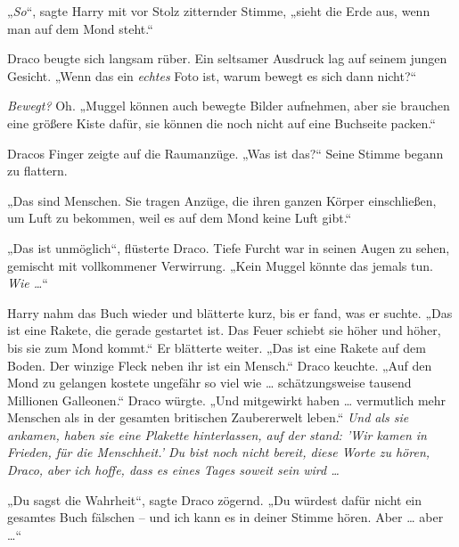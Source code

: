 {„\emph{So}“, sagte Harry mit vor Stolz zitternder Stimme, „sieht die Erde aus, wenn man auf dem Mond steht.“

Draco beugte sich langsam rüber. Ein seltsamer Ausdruck lag auf seinem jungen Gesicht. „Wenn das ein \emph{echtes} Foto ist, warum bewegt es sich dann nicht?“

\emph{Bewegt?} Oh. „Muggel können auch bewegte Bilder aufnehmen, aber sie brauchen eine größere Kiste dafür, sie können die noch nicht auf eine Buchseite packen.“

Dracos Finger zeigte auf die Raumanzüge. „Was ist das?“ Seine Stimme begann zu flattern.

„Das sind Menschen. Sie tragen Anzüge, die ihren ganzen Körper einschließen, um Luft zu bekommen, weil es auf dem Mond keine Luft gibt.“

„Das ist unmöglich“, flüsterte Draco. Tiefe Furcht war in seinen Augen zu sehen, gemischt mit vollkommener Verwirrung. „Kein Muggel könnte das jemals tun. \emph{Wie …}“

Harry nahm das Buch wieder und blätterte kurz, bis er fand, was er suchte. „Das ist eine Rakete, die gerade gestartet ist. Das Feuer schiebt sie höher und höher, bis sie zum Mond kommt.“ Er blätterte weiter. „Das ist eine Rakete auf dem Boden. Der winzige Fleck neben ihr ist ein Mensch.“ Draco keuchte. „Auf den Mond zu gelangen kostete ungefähr so viel wie … schätzungsweise tausend Millionen Galleonen.“ Draco würgte. „Und mitgewirkt haben … vermutlich mehr Menschen als in der gesamten britischen Zaubererwelt leben.“ \emph{Und als sie ankamen, haben sie eine Plakette hinterlassen, auf der stand: 'Wir kamen in Frieden, für die Menschheit.' Du bist noch nicht bereit, diese Worte zu hören, Draco, aber ich hoffe, dass es eines Tages soweit sein wird …}

„Du sagst die Wahrheit“, sagte Draco zögernd. „Du würdest dafür nicht ein gesamtes Buch fälschen -- und ich kann es in deiner Stimme hören. Aber … aber …“

}
